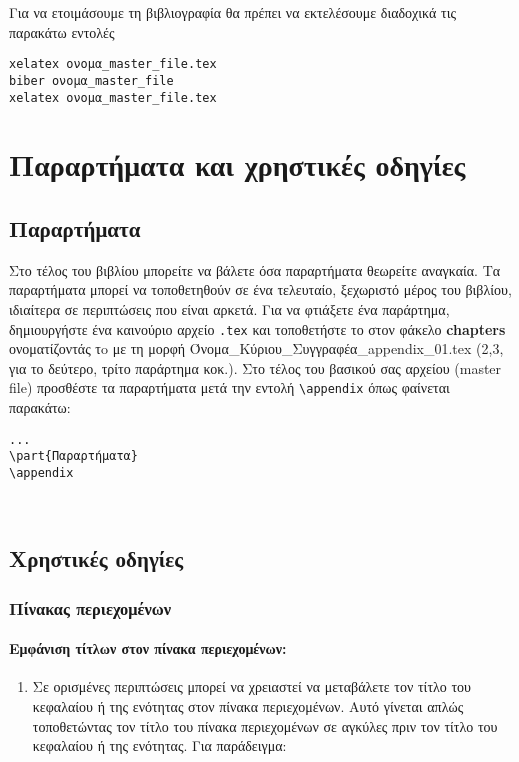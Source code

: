 \begin{refsection}
Για να ετοιμάσουμε τη βιβλιογραφία θα πρέπει να εκτελέσουμε διαδοχικά τις παρακάτω εντολές
\begin{verbatim}
xelatex ονομα_master_file.tex
biber ονομα_master_file
xelatex ονομα_master_file.tex
\end{verbatim}
\section{Παραρτήματα και χρηστικές οδηγίες}
\subsection{Παραρτήματα}
Στο τέλος του βιβλίου μπορείτε να βάλετε όσα παραρτήματα θεωρείτε αναγκαία. Τα παραρτήματα μπορεί να
τοποθετηθούν σε ένα τελευταίο, ξεχωριστό μέρος του βιβλίου, ιδιαίτερα σε περιπτώσεις που είναι αρκετά.
Για να φτιάξετε ένα παράρτημα, δημιουργήστε ένα καινούριο αρχείο \texttt{.tex} και τοποθετήστε το
στον φάκελο \textbf{chapters} ονοματίζοντάς τo με τη μορφή Όνομα\_Κύριου\_Συγγραφέα\_appendix\_01.tex
(2,3, για το δεύτερο, τρίτο παράρτημα κοκ.).
Στο τέλος του βασικού σας αρχείου (master file) προσθέστε τα παραρτήματα μετά την εντολή \verb|\appendix| όπως φαίνεται
παρακάτω:
\begin{verbatim}
...
\part{Παραρτήματα}
\appendix



\end{verbatim}
\subsection{Χρηστικές οδηγίες}
\subsubsection{Πίνακας περιεχομένων}
\paragraph{Εμφάνιση τίτλων στον πίνακα περιεχομένων:}
\begin{enumerate}
\item Σε ορισμένες περιπτώσεις μπορεί να χρειαστεί να
μεταβάλετε τον τίτλο του κεφαλαίου ή της ενότητας στον πίνακα περιεχομένων. Αυτό
γίνεται απλώς τοποθετώντας τον τίτλο του πίνακα περιεχομένων σε αγκύλες πριν τον τίτλο του
κεφαλαίου ή της ενότητας. Για παράδειγμα:
\begin{verbatim}

\end{verbatim}
\end{enumerate}
\end{refsection}
